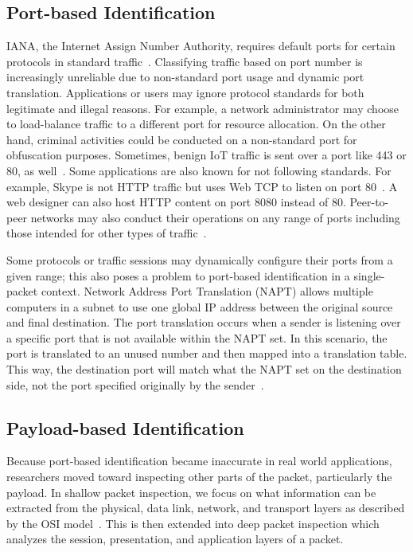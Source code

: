 \subsection{Port-based Identification}
IANA, the Internet Assign Number Authority, requires default ports for certain protocols in standard traffic~\cite{IANA}. Classifying traffic based on port number is increasingly unreliable due to non-standard port usage and dynamic port translation. Applications or users may ignore protocol standards for both legitimate and illegal reasons. For example, a network administrator may choose to load-balance traffic to a different port for resource allocation. On the other hand, criminal activities could be conducted on a non-standard port for obfuscation purposes. Sometimes, benign IoT traffic is sent over a port like 443 or 80, as well~\cite{charyyev2020iot}. Some applications are also known for not following standards. For example, Skype is not HTTP traffic but uses Web TCP to listen on port 80~\cite{Freire}. A web designer can also host HTTP content on port 8080 instead of 80. Peer-to-peer networks may also conduct their operations on any range of ports including those intended for other types of traffic~\cite{Karagiannis}.


Some protocols or traffic sessions may dynamically configure their ports from a given range; this also poses a problem to port-based identification in a single-packet context. Network Address Port Translation (NAPT) allows multiple computers in a subnet to use one global IP address between the original source and final destination. The port translation occurs when a sender is listening over a specific port that is not available within the NAPT set. In this scenario, the port is translated to an unused number and then mapped into a translation table. This way, the destination port will match what the NAPT set on the destination side, not the port specified originally by the sender~\cite{Smith}.

\subsection{Payload-based Identification}
Because port-based identification became inaccurate in real world applications, researchers moved toward inspecting other parts of the packet, particularly the payload. In shallow packet inspection, we focus on what information can be extracted from the physical, data link, network, and transport layers as described by the OSI model~\cite{OSI}. This is then extended into deep packet inspection which analyzes the session, presentation, and application layers of a packet.

